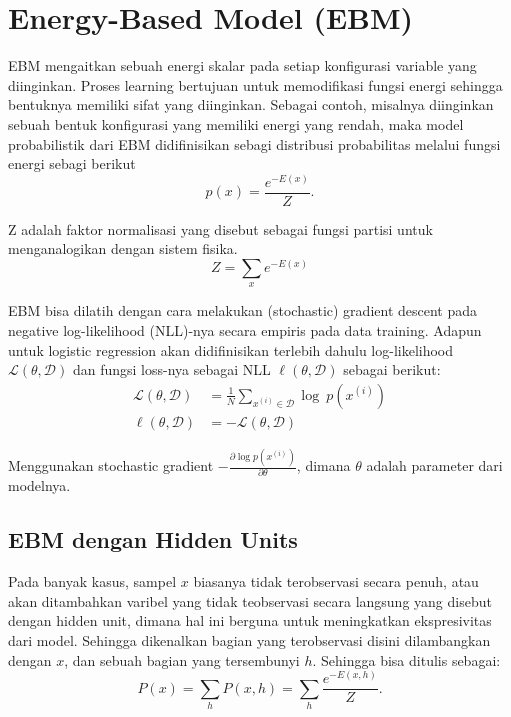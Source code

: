 \section{Energy-Based Model (EBM)}

EBM mengaitkan sebuah energi skalar pada setiap konfigurasi variable yang diinginkan. Proses learning bertujuan untuk memodifikasi fungsi energi sehingga bentuknya memiliki  sifat yang diinginkan. Sebagai contoh, misalnya diinginkan sebuah bentuk konfigurasi yang memiliki energi yang rendah, maka model probabilistik dari EBM didifinisikan sebagi distribusi probabilitas melalui fungsi energi sebagi berikut\citep{tutorial2014lisa}
\begin{equation}
p(x) = \frac {e^{-E(x)}} {Z}.
\end{equation}

Z adalah faktor normalisasi yang disebut sebagai fungsi partisi untuk menganalogikan dengan sistem fisika.
\begin{equation}
Z = \sum_x e^{-E(x)}
\end{equation}


EBM bisa dilatih dengan cara melakukan (stochastic) gradient descent pada negative log-likelihood (NLL)-nya secara empiris pada data training. Adapun untuk logistic regression akan didifinisikan terlebih dahulu log-likelihood $\mathcal{L}(\theta, \mathcal{D})$ dan fungsi loss-nya sebagai NLL $\ell (\theta, \mathcal{D})$ sebagai berikut:
\begin{equation}
\begin{aligned}
\mathcal{L}(\theta, \mathcal{D}) &= \frac{1}{N} \sum_{x^{(i)} \in
\mathcal{D}} \log\ p(x^{(i)}) \\
\ell (\theta, \mathcal{D}) &= - \mathcal{L} (\theta, \mathcal{D})
\end{aligned}
\end{equation}


Menggunakan stochastic gradient $-\frac{\partial  \log p(x^{(i)})}{\partial
\theta}$, dimana $\theta$ adalah parameter dari modelnya\citep{poultney2006efficient}.

\subsection{EBM dengan Hidden Units}

Pada banyak kasus, sampel $x$ biasanya tidak terobservasi secara penuh, atau akan ditambahkan varibel yang tidak teobservasi secara langsung yang disebut dengan hidden unit, dimana hal ini berguna untuk meningkatkan ekspresivitas dari model. Sehingga dikenalkan bagian yang terobservasi disini dilambangkan dengan $x$, dan sebuah bagian yang tersembunyi $h$. Sehingga bisa ditulis sebagai:
\begin{equation}
P(x) = \sum_h P(x,h) = \sum_h \frac{e^{-E(x,h)}}{Z}.
\end{equation}

